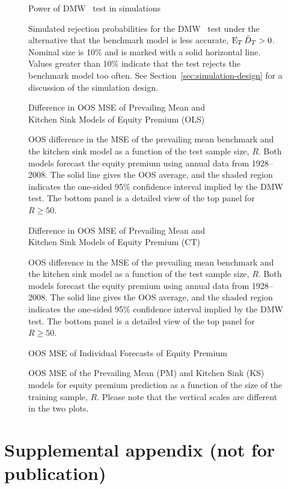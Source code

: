 \documentclass[12pt,draft]{article}
\begin{document}
\begin{figure}\centering
  {\large Power of DMW \oost\ test in simulations}
  \caption{Simulated rejection probabilities for the DMW \oost\ test
    under the alternative that the benchmark model is less accurate,
    $\operatorname{E}_T \bar{D}_{T} > 0$. Nominal size is 10\% and is marked with a solid
    horizontal line. Values greater than 10\% indicate that the test
    rejects the benchmark model too often. See
    Section~\ref{sec:simulation-design} for a discussion of the
    simulation design.}
  \label{fig:ttest-power}
\end{figure}
\clearpage

\begin{figure}
\centering
\large{Difference in OOS MSE of Prevailing Mean and\\ Kitchen
    Sink Models of Equity Premium (OLS)}
\caption{OOS difference in the MSE
  of the prevailing mean benchmark and the kitchen sink model as a
  function of the test sample size, $R$.  Both models forecast the
  equity premium using annual data from 1928--2008.  The solid line
  gives the OOS average, and the shaded region indicates the
  one-sided 95\% confidence interval implied by the
  DMW test.  The bottom panel is a detailed view of the top
  panel for $R \geq 50$.}
\label{fig:empirics1}
\end{figure}
\clearpage

\begin{figure}
\centering
\large{Difference in OOS MSE of Prevailing Mean and\\ Kitchen
    Sink Models of Equity Premium (CT)}
\caption{OOS difference in the MSE
  of the prevailing mean benchmark and the kitchen sink model as a
  function of the test sample size, $R$.  Both models forecast the
  equity premium using annual data from 1928--2008.  The solid line
  gives the OOS average, and the shaded region indicates the
  one-sided 95\% confidence interval implied by the
  DMW test.  The bottom panel is a detailed view of the top
  panel for $R \geq 50$.}
\label{fig:empirics2}
\end{figure}
\clearpage

\begin{figure}
\centering
\large{OOS MSE of Individual Forecasts of Equity Premium}
\caption{OOS MSE of the Prevailing Mean (PM) and
    Kitchen Sink (KS) models for equity premium prediction as
    a function of the size of the training sample, $R$.  Please note
    that the vertical scales are different in the two plots.}
\label{fig:empirics3}
\end{figure}

\clearpage




\clearpage
\section{Supplemental appendix (not for publication)}

\end{document}

